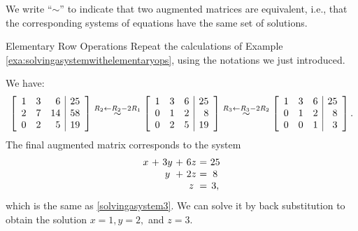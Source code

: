 We write ``$\sim$'' to indicate that two augmented matrices are
equivalent, i.e., that the corresponding systems of equations have the
same set of solutions.

\begin{example}{Elementary Row Operations}{}
  Repeat the calculations of Example
  \ref{exa:solvingasystemwithelementaryops}, using the notations we
  just introduced.
\end{example}

\begin{solution}
  We have:
  \begin{equation*}
    \left[ 
    \begin{array}{rrr|r}
      1 & 3 & 6 &  25 \\
      2 & 7 & 14 &  58 \\
      0 & 2 & 5 &  19
    \end{array}
    \right] 
    \stackrel{R_2\leftarrow R_2-2R_1}{\sim}
    \left[
    \begin{array}{rrr|r}
      1 & 3 & 6 & 25 \\
      0 & 1 & 2 & 8 \\
      0 & 2 & 5 & 19
    \end{array}
    \right] 
    \stackrel{R_3\leftarrow R_3-2R_2}{\sim}
    \left[ 
    \begin{array}{rrr|r}
      1 & 3 & 6 & 25 \\
      0 & 1 & 2 & 8 \\
      0 & 0 & 1 & 3
    \end{array}
    \right].
  \end{equation*}
  The final augmented matrix corresponds to the system
  \begin{equation*}
    \begin{array}{c@{~}c@{~}c@{~}c@{~}c@{~}c@{~}c}
      x&+&3y&+&6z&=&25 \\
      &&y&+&2z&=&8 \\
      &&&&z&=&3,
    \end{array}
  \end{equation*}
  which is the same as \ref{solvingasystem3}. We can solve it by back
  substitution to obtain the solution $x=1,y=2,$ and $z=3$.


\end{solution}
